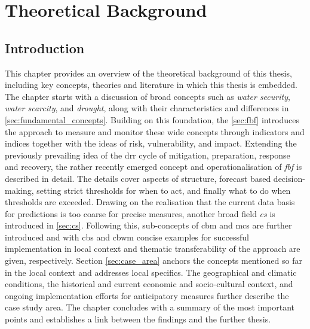
\chapter{Theoretical Background} %

\label{chapter2} %

\section{Introduction}

This chapter provides an overview of the theoretical background of this thesis, including key concepts, theories and literature in which this thesis is embedded. The chapter starts with a discussion of broad concepts such as \textit{water security}, \textit{water scarcity}, and \textit{drought}, along with their characteristics and differences in \autoref{sec:fundamental_concepts}. Building on this foundation, the \autoref{sec:fbf} introduces the approach to measure and monitor these wide concepts through indicators and indices together with the ideas of risk, vulnerability, and impact. Extending the previously prevailing idea of the \acrfull{drr} cycle of mitigation, preparation, response and recovery, the rather recently emerged concept and operationalisation of \textit{\acrfull{fbf}} is described in detail. The details cover aspects of structure, forecast based decision-making, setting strict thresholds for when to act, and finally what to do when thresholds are exceeded.\newline
Drawing on the realisation that the current data basis for predictions is too coarse for precise measures, another broad field \textit{\acrfull{cs}} is introduced in \autoref{sec:cs}. Following this, sub-concepts of \acrfull{cbm} and \acrfull{mcs} are further introduced and with \acrfull{cbs} and \acrfull{cbwm} concise examples for successful implementation in local context and thematic transferability of the approach are given, respectively.\newline
Section \ref{sec:case_area} anchors the concepts mentioned so far in the local context and addresses local specifics. The geographical and climatic conditions, the historical and current economic and socio-cultural context, and ongoing implementation efforts for anticipatory measures further describe the case study area. The chapter concludes with a summary of the most important points and establishes a link between the findings and the further thesis.

